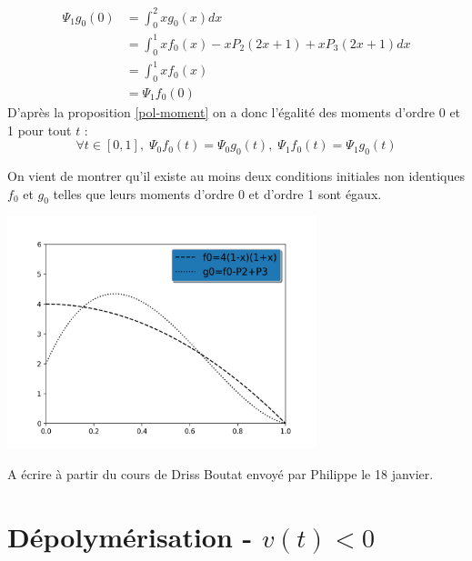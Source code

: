 \documentclass[a4paper]{article}
\begin{document}
\begin{preuve}
	\[
	\begin{split}
		\Psi_1 g_0 (0) & = \int_0^2 x g_0(x)dx \\
		               & = \int_0^1 xf_0 (x) - xP_2(2x+1) + xP_3(2x+1) dx \\
					   & =  \int_0^1 xf_0 (x) \\
					   & = \Psi_1 f_0 (0)
	\end{split}
	\]
	D'après la proposition \ref{pol-moment} on a donc l'égalité des moments d'ordre 0 et 1 pour tout $t$ :
	\[ \forall t \in [0,1], \; \Psi_0 f_0 (t) = \Psi_0 g_0 (t), \; \Psi_1 f_0 (t)=\Psi_1 g_0 (t)\]
	
	On vient de montrer qu'il existe au moins deux conditions initiales non identiques $f_0$ et $g_0$ telles que leurs moments d'ordre 0 et d'ordre 1 sont égaux. 
	
	\includegraphics[width=9cm]{OLD/f0g0.png}
	

\end{preuve}
	
A écrire à partir du cours de Driss Boutat envoyé par Philippe le 18 janvier.


\section{Dépolymérisation - $v(t) < 0$}
\end{document}
